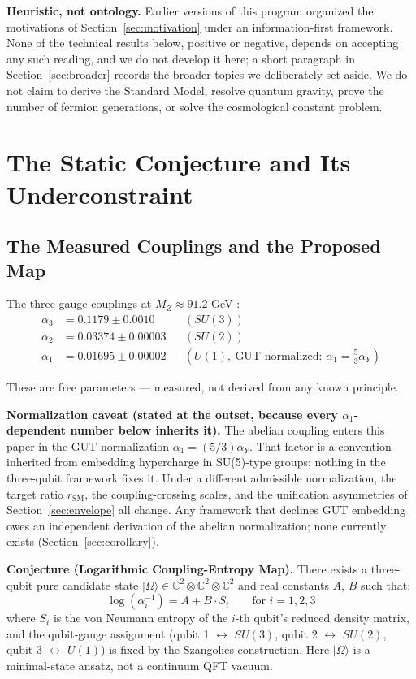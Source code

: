 \documentclass[11pt]{article}
\newcommand{\CC}{\mathbb{C}}
\newcommand{\rSM}{r_{\mathrm{SM}}}
\begin{document}
\textbf{Heuristic, not ontology.} Earlier versions of this program organized the motivations of Section~\ref{sec:motivation} under an information-first framework. None of the technical results below, positive or negative, depends on accepting any such reading, and we do not develop it here; a short paragraph in Section~\ref{sec:broader} records the broader topics we deliberately set aside. We do not claim to derive the Standard Model, resolve quantum gravity, prove the number of fermion generations, or solve the cosmological constant problem.

\section{The Static Conjecture and Its Underconstraint}
\label{sec:static}

\subsection{The Measured Couplings and the Proposed Map}
\label{sec:conjecture}

The three gauge couplings at $M_Z \approx 91.2$ GeV \cite{pdg}:
\begin{align*}
\alpha_3 &= 0.1179 \pm 0.0010 && (SU(3)) \\
\alpha_2 &= 0.03374 \pm 0.00003 && (SU(2)) \\
\alpha_1 &= 0.01695 \pm 0.00002 && (U(1),\ \text{GUT-normalized: } \alpha_1 = \tfrac{5}{3}\alpha_Y)
\end{align*}

These are free parameters --- measured, not derived from any known principle.

\textbf{Normalization caveat (stated at the outset, because every $\alpha_1$-dependent number below inherits it).} The abelian coupling enters this paper in the GUT normalization $\alpha_1 = (5/3)\alpha_Y$. That factor is a convention inherited from embedding hypercharge in SU(5)-type groups; nothing in the three-qubit framework fixes it. Under a different admissible normalization, the target ratio $\rSM$, the coupling-crossing scales, and the unification asymmetries of Section~\ref{sec:envelope} all change. Any framework that declines GUT embedding owes an independent derivation of the abelian normalization; none currently exists (Section~\ref{sec:corollary}).

\textbf{Conjecture (Logarithmic Coupling-Entropy Map).} There exists a three-qubit pure candidate state $|\Omega\rangle \in \CC^2 \otimes \CC^2 \otimes \CC^2$ and real constants $A$, $B$ such that:
\begin{equation}
\log(\alpha_i^{-1}) = A + B \cdot S_i \qquad \text{for } i = 1, 2, 3
\label{eq:logmap}
\end{equation}
where $S_i$ is the von Neumann entropy of the $i$-th qubit's reduced density matrix, and the qubit-gauge assignment (qubit 1 $\leftrightarrow$ $SU(3)$, qubit 2 $\leftrightarrow$ $SU(2)$, qubit 3 $\leftrightarrow$ $U(1)$) is fixed by the Szangolies construction. Here $|\Omega\rangle$ is a minimal-state ansatz, not a continuum QFT vacuum.
\end{document}
